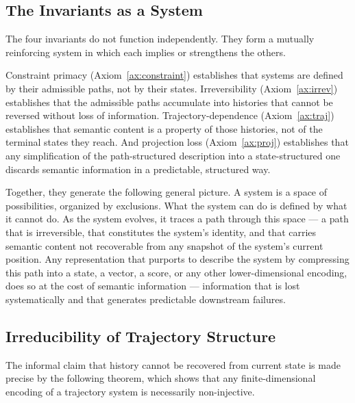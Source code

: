 \documentclass[12pt, twoside]{article}
\theoremstyle{plain}
\theoremstyle{definition}
\theoremstyle{remark}
\begin{document}
\subsection{The Invariants as a System}

The four invariants do not function independently.
They form a mutually reinforcing system in which each implies or
strengthens the others.

Constraint primacy (Axiom~\ref{ax:constraint}) establishes that
systems are defined by their admissible paths, not by their states.
Irreversibility (Axiom~\ref{ax:irrev}) establishes that the admissible
paths accumulate into histories that cannot be reversed without
loss of information.
Trajectory-dependence (Axiom~\ref{ax:traj}) establishes that semantic
content is a property of those histories, not of the terminal states
they reach.
And projection loss (Axiom~\ref{ax:proj}) establishes that any
simplification of the path-structured description into a state-structured
one discards semantic information in a predictable, structured way.

Together, they generate the following general picture.
A system is a space of possibilities, organized by exclusions.
What the system can do is defined by what it cannot do.
As the system evolves, it traces a path through this space —
a path that is irreversible, that constitutes the system's identity,
and that carries semantic content not recoverable from any snapshot
of the system's current position.
Any representation that purports to describe the system
by compressing this path into a state, a vector, a score,
or any other lower-dimensional encoding, does so at the cost of
semantic information — information that is lost systematically
and that generates predictable downstream failures.

\subsection{Irreducibility of Trajectory Structure}

The informal claim that history cannot be recovered from current
state is made precise by the following theorem, which shows that
any finite-dimensional encoding of a trajectory system is necessarily
non-injective.
\end{document}
